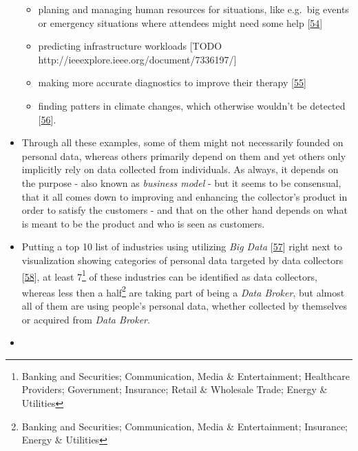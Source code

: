 \documentclass[12pt,english,a4paper,titlepage,cleardoublepage=empty,dottedtoc]{report}
\providecommand{\tightlist}{%
  \setlength{\itemsep}{0pt}\setlength{\parskip}{0pt}}
\begin{document}
\begin{itemize}
  \begin{itemize}
  \tightlist
  \item
    planing and managing human resources for situations, like e.g.~big
    events or emergency situations where attendees might need some help
    {[}\protect\hyperlink{ref-estimating-the-locations-of-emergency-events-from-twitter-streams_2014}{54}{]}
  \item
    predicting infrastructure workloads {[}TODO
    http://ieeexplore.ieee.org/document/7336197/{]}
  \item
    making more accurate diagnostics to improve their therapy
    {[}\protect\hyperlink{ref-the-practice-of-predictive-analytics-in-healthcare_2013}{55}{]}
  \item
    finding patters in climate changes, which otherwise wouldn't be
    detected
    {[}\protect\hyperlink{ref-data-collection-for-climate-changes_2014}{56}{]}.
  \end{itemize}
\item
  Through all these examples, some of them might not necessarily founded
  on personal data, whereas others primarily depend on them and yet
  others only implicitly rely on data collected from individuals. As
  always, it depends on the purpose - also known as \emph{business
  model} - but it seems to be consensual, that it all comes down to
  improving and enhancing the collector's product in order to satisfy
  the customers - and that on the other hand depends on what is meant to
  be the product and who is seen as customers.
\item
  Putting a top 10 list of industries using utilizing \emph{Big Data}
  {[}\protect\hyperlink{ref-graphic_2015_applications-of-big-data-in-10-industry-verticals}{57}{]}
  right next to visualization showing categories of personal data
  targeted by data collectors\\
  {[}\protect\hyperlink{ref-graphic_2012_personal-data-ecosystem}{58}{]},
  at least 7\footnote{Banking and Securities; Communication, Media \&
    Entertainment; Healthcare Providers; Government; Insurance; Retail
    \& Wholesale Trade; Energy \& Utilities} of these industries can be
  identified as data collectors, whereas less then a half\footnote{Banking
    and Securities; Communication, Media \& Entertainment; Insurance;
    Energy \& Utilities} are taking part of being a \emph{Data Broker},
  but almost all of them are using people's personal data, whether
  collected by themselves or acquired from \emph{Data Broker}.
\item

\end{itemize}
\end{document}
